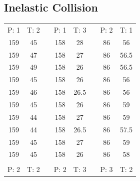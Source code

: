 \documentclass{scrreprt}
\begin{document}
\subsection{Inelastic Collision}
\begin{table}[H]
	\centering
	\begin{tabular}{ccp{1.5cm}ccp{1.5cm}cc}
 P: 1 &   T: 2 &            &  P: 1 &   T: 3 &            &  P: 2 &   T: 1 \\\cline{1-2}\cline{4-5}\cline{7-8}

     159 &         45 &            &      158 &         28 &            &         86 &         56 \\
     159 &         47 &            &      158 &         27 &            &         86 &         56.5 \\
     159 &         49 &            &      158 &         26 &            &         86 &         56.5 \\
     159 &         45 &            &      158 &         26 &          &         86 &         56 \\
     159 &         46 &            &      158 &         26.5 &          &         86 &         56 \\
     159 &         45 &            &      158 &         26 &          &         86 &         59 \\
     159 &         44 &            &      158 &         27 &            &         86 &         59 \\
     159 &         44 &            &      158 &         26.5 &          &         86 &         57.5 \\
     159 &         45 &            &      158 &         27 &            &         86 &         59 \\
     159 &         45 &            &      158 &         26 &            &         86 &         58 \\
         &            &            &            &            &            &            &            \\

 P: 2 &   T: 2 &            &  P: 2 &   T: 3 &            &  P: 3 &   T: 2 \\\cline{1-2}\cline{4-5}\cline{7-8}


\end{tabular}
\end{table}
\end{document}
